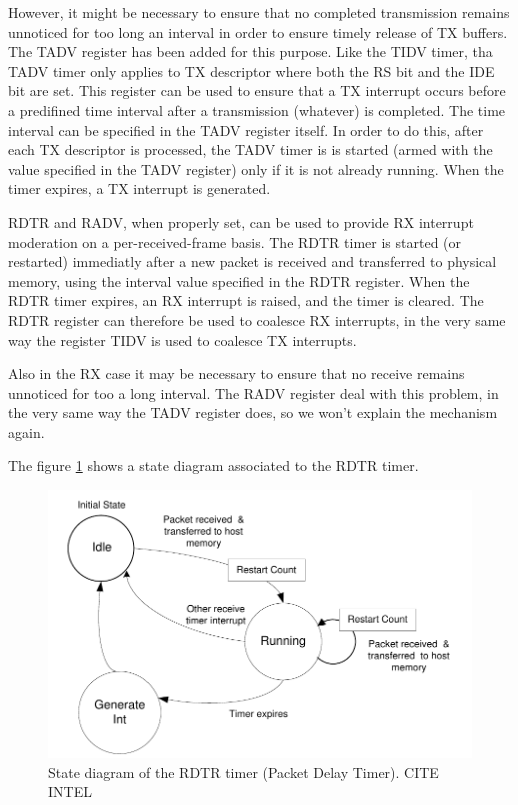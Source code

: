 However, it might be necessary to ensure that no completed transmission remains unnoticed for too long an interval in order to 
ensure timely release of TX buffers.
The TADV register has been added for this purpose. Like the TIDV timer, tha TADV timer only applies to TX descriptor where both the
RS bit and the IDE bit are set. This register can be used to ensure that a TX interrupt occurs before a predifined time interval
after a transmission (whatever) is completed. The time interval can be specified in the TADV register itself.
In order to do this, after each TX descriptor is processed, the TADV timer is is started (armed with the value specified in the TADV 
register) only if it is not already running.
When the timer expires, a TX interrupt is generated.

\vspace{0.5cm}

RDTR and RADV, when properly set, can be used to provide RX interrupt moderation on a per-received-frame basis.
The RDTR timer is started (or restarted) immediatly after a new packet is received and transferred to physical memory, using
the interval value specified in the RDTR register. When the RDTR timer expires, an RX interrupt is raised, and the timer is cleared.
The RDTR register can therefore be used to coalesce RX interrupts, in the very same way the register TIDV is used to coalesce TX
interrupts.

Also in the RX case it may be necessary to ensure that no receive remains unnoticed for too a long interval. The RADV register deal
with this problem, in the very same way the TADV register does, so we won't explain the mechanism again.

\vspace{0.5cm}

The figure \ref{fig:rdtrstate} shows a state diagram associated to the RDTR timer.

\begin{figure}[bt]
\centering
\includegraphics[scale = 0.45]{rdtr-state.png}
\caption{State diagram of the RDTR timer (Packet Delay Timer). CITE INTEL}
\label{fig:rdtrstate}
\end{figure}


